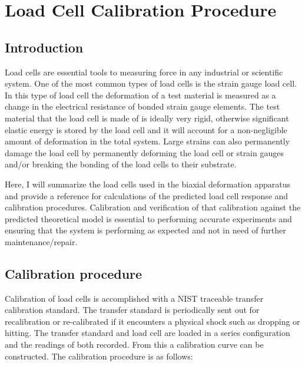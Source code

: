 \chapter{Load Cell Calibration Procedure}

\section{Introduction}

Load cells are essential tools to measuring force in any industrial or
scientific system. One of the most common types of load cells is the strain
gauge load cell. In this type of load cell the deformation of a test material is
measured as a change in the electrical resistance of bonded strain gauge
elements. The test material that the load cell is made of is ideally very rigid,
otherwise significant elastic energy is stored by the load cell and it will
account for a non-negligible amount of deformation in the total system. Large
strains can also permanently damage the load cell by permanently deforming the
load cell or strain gauges and/or breaking the bonding of the load cells to
their substrate.

Here,  I will summarize the load cells used in the biaxial deformation apparatus
and provide a reference for calculations of the predicted load cell response and
calibration procedures. Calibration and verification of that calibration against
the predicted theoretical model is essential to performing accurate experiments
and ensuring that the system is performing as expected and not in need of
further maintenance/repair. 

\section{Calibration procedure}
Calibration of load cells is accomplished with a NIST traceable transfer
calibration standard. The transfer standard is periodically sent out for
recalibration or re-calibrated if it encounters a physical shock such as dropping
or hitting. The transfer standard and load cell are loaded in a series
configuration and the readings of both recorded. From this a calibration curve
can be constructed. The calibration procedure is as follows:

